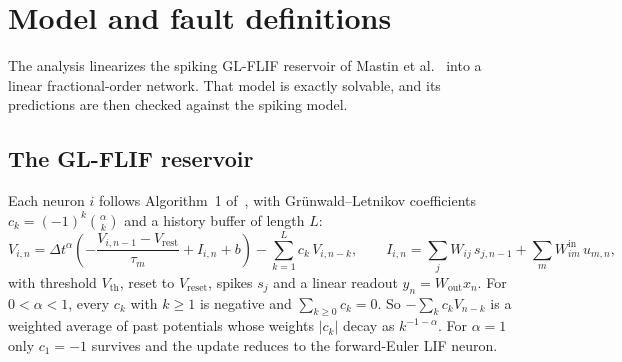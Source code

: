 \documentclass[11pt,a4paper]{article}
\begin{document}
\section{Model and fault definitions}

The analysis linearizes the spiking GL-FLIF reservoir of Mastin et al.~\cite{mastin2026} into a linear fractional-order network. That model is exactly solvable, and its predictions are then checked against the spiking model.

\subsection{The GL-FLIF reservoir}

Each neuron $i$ follows Algorithm~1 of~\cite{mastin2026}, with Gr\"unwald--Letnikov coefficients $c_k = (-1)^k\binom{\alpha}{k}$ and a history buffer of length $L$:
\begin{equation}
V_{i,n} = \Delta t^{\alpha}\left( -\frac{V_{i,n-1} - V_{\mathrm{rest}}}{\tau_m} + I_{i,n} + b \right) - \sum_{k=1}^{L} c_k \, V_{i,n-k},
\qquad
I_{i,n} = \sum_j W_{ij}\, s_{j,n-1} + \sum_m W^{\mathrm{in}}_{im}\, u_{m,n},
\label{eq:glflif}
\end{equation}
with threshold $V_{\mathrm{th}}$, reset to $V_{\mathrm{reset}}$, spikes $s_j$ and a linear readout $y_n = W_{\mathrm{out}} x_n$. For $0<\alpha<1$, every $c_k$ with $k\ge 1$ is negative and $\sum_{k\ge 0} c_k = 0$. So $-\sum_k c_k V_{n-k}$ is a weighted average of past potentials whose weights $|c_k|$ decay as $k^{-1-\alpha}$. For $\alpha=1$ only $c_1=-1$ survives and the update reduces to the forward-Euler LIF neuron.
\end{document}
